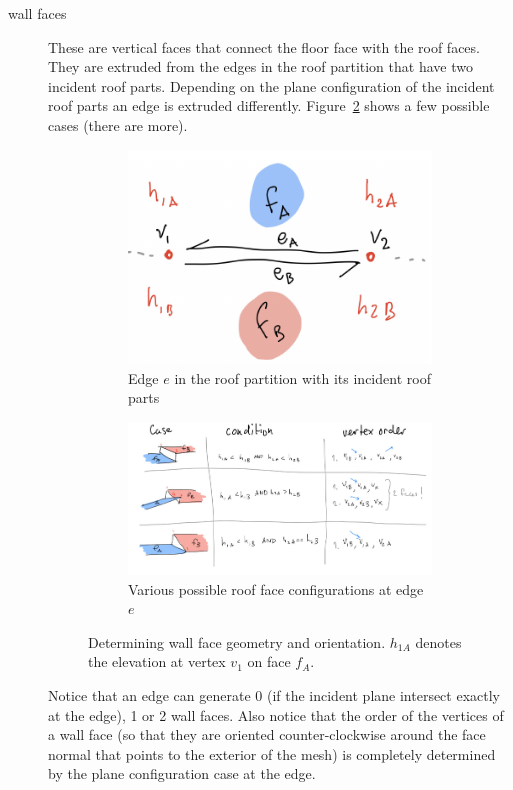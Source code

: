 \begin{description}
\item[wall faces] These are vertical faces that connect the floor face with the roof faces. They are extruded from the edges in the roof partition that have two incident roof parts. Depending on the plane configuration of the incident roof parts an edge is extruded differently. Figure~\ref{fig:extrusion-edge:cases} shows a few possible cases (there are more).
\begin{figure}
	\centering
	\begin{subfigure}[b]{0.25\linewidth}
		\includegraphics[width=\linewidth]{figs/extrusion-edge.pdf}
		\caption{Edge $e$ in the roof partition with its incident roof parts}%
		\label{fig:extrusion-edge:detail}
	\end{subfigure}
	\quad
	\begin{subfigure}[b]{0.7\linewidth}
		\includegraphics[width=\linewidth]{figs/extrusion-edge-cases.pdf}
		\caption{Various possible roof face configurations at edge $e$}%
		\label{fig:extrusion-edge:cases}
	\end{subfigure}
	\caption{Determining wall face geometry and orientation. $h_{1A}$ denotes the elevation at vertex $v_1$ on face $f_A$.}%
	\label{fig:extrusion-edge}
\end{figure}
Notice that an edge can generate 0 (if the incident plane intersect exactly at the edge), 1 or 2 wall faces.
Also notice that the order of the vertices of a wall face (so that they are oriented counter-clockwise around the face normal that points to the exterior of the mesh) is completely determined by the plane configuration case at the edge.


\end{description}
